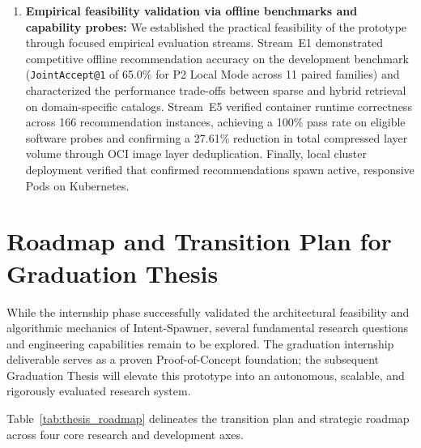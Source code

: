 \begin{enumerate}
    \item \textbf{Empirical feasibility validation via offline benchmarks and capability probes:} We established the practical feasibility of the prototype through focused empirical evaluation streams. Stream~E1 demonstrated competitive offline recommendation accuracy on the development benchmark (\texttt{JointAccept@1} of 65.0\% for P2 Local Mode across 11 paired families) and characterized the performance trade-offs between sparse and hybrid retrieval on domain-specific catalogs. Stream~E5 verified container runtime correctness across 166 recommendation instances, achieving a 100\% pass rate on eligible software probes and confirming a 27.61\% reduction in total compressed layer volume through OCI image layer deduplication. Finally, local cluster deployment verified that confirmed recommendations spawn active, responsive Pods on Kubernetes.
\end{enumerate}

\section{Roadmap and Transition Plan for Graduation Thesis}
\label{sec:thesis_roadmap}

While the internship phase successfully validated the architectural feasibility and algorithmic mechanics of Intent-Spawner, several fundamental research questions and engineering capabilities remain to be explored. The graduation internship deliverable serves as a proven Proof-of-Concept foundation; the subsequent Graduation Thesis will elevate this prototype into an autonomous, scalable, and rigorously evaluated research system. 

Table~\ref{tab:thesis_roadmap} delineates the transition plan and strategic roadmap across four core research and development axes.

